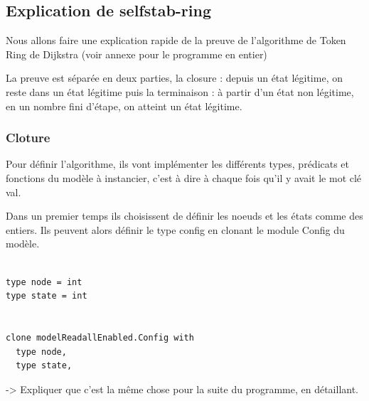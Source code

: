 \documentclass[11pt]{article}
\begin{document}
\subsection{Explication de selfstab-ring}
\label{sec:orga2176d9}
Nous allons faire une explication rapide de la preuve de l'algorithme de Token Ring de Dijkstra (voir annexe pour le programme en entier)

La preuve est séparée en deux parties, la closure : depuis un état légitime, on reste dans un état légitime 
puis la terminaison : à partir d'un état non légitime, en un nombre fini d'étape, on atteint un état légitime.

\subsubsection{Cloture}
\label{sec:org105e0de}
Pour définir l'algorithme, ils vont implémenter les différents types, prédicats et fonctions du modèle à instancier, c'est à dire à chaque fois
qu'il y avait le mot clé val.


Dans un premier temps ils choisissent de définir les noeuds et les états comme des entiers. 
Ils peuvent alors définir le type config en clonant le module Config du modèle. 


\lstset{language=why3,label= ,caption= ,captionpos=b,numbers=none}
\begin{lstlisting}

type node = int
type state = int


clone modelReadallEnabled.Config with
  type node,
  type state,

\end{lstlisting}

-> Expliquer que c'est la même chose pour la suite du programme, en détaillant.
\end{document}
